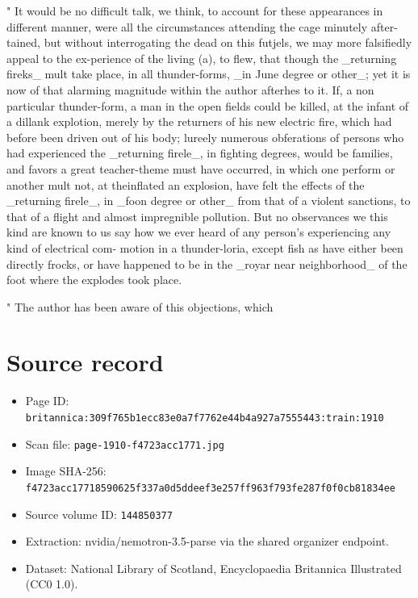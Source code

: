 \documentclass{article}
\begin{document}
" It would be no difficult talk, we think, to account for these appearances in different manner, were all the circumstances attending the cage minutely after-tained, but without interrogating the dead on this futjels, we may more falsifiedly appeal to the ex-perience of the living (a), to flew, that though the \_returning fireks\_ mult take place, in all thunder-forms, \_in June degree or other\_; yet it is now of that alarming magnitude within the author afterhes to it. If, a non particular thunder-form, a man in the open fields could be killed, at the infant of a dillank explotion, merely by the returners of his new electric fire, which had before been driven out of his body; lureely numerous obferations of persons who had experienced the \_returning firele\_, in fighting degrees, would be families, and favors a great teacher-theme must have occurred, in which one perform or another mult not, at theinflated an explosion, have felt the effects of the \_returning firele\_, in \_foon degree or other\_ from that of a violent sanctions, to that of a flight and almost impregnible pollution. But no observances we this kind are known to us say how we ever heard of any person's experiencing any kind of electrical com- motion in a thunder-loria, except fish as have either been directly frocks, or have happened to be in the \_royar near neighborhood\_ of the foot where the explodes took place.

" The author has been aware of this objections, which

\section*{Source record}
\begin{itemize}
\item Page ID: \texttt{britannica:309f765b1ecc83e0a7f7762e44b4a927a7555443:train:1910}
\item Scan file: \texttt{page-1910-f4723acc1771.jpg}
\item Image SHA-256: \texttt{f4723acc17718590625f337a0d5ddeef3e257ff963f793fe287f0f0cb81834ee}
\item Source volume ID: \texttt{144850377}
\item Extraction: nvidia/nemotron-3.5-parse via the shared organizer endpoint.
\item Dataset: National Library of Scotland, Encyclopaedia Britannica Illustrated (CC0 1.0).
\end{itemize}
\end{document}
